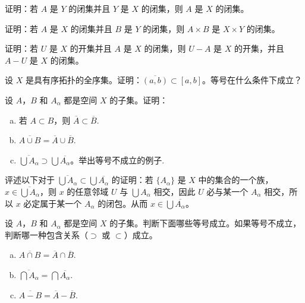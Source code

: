 \documentclass[../../main.tex]{subfiles}
\begin{document}
\begin{exercise}\label{exercise:ch02-闭集与极限点-2}
证明：若 $A$ 是 $Y$ 的闭集并且 $Y$ 是 $X$ 的闭集，则 $A$ 是 $X$ 的闭集。
\end{exercise}

\begin{exercise}\label{exercise:ch02-闭集与极限点-3}
证明：若 $A$ 是 $X$ 的闭集并且 $B$ 是 $Y$ 的闭集，则 $A \times B$ 是 $X \times Y$ 的闭集。
\end{exercise}

\begin{exercise}\label{exercise:ch02-闭集与极限点-4}
证明：若 $U$ 是 $X$ 的开集并且 $A$ 是 $X$ 的闭集，则 $U - A$ 是 $X$ 的开集，并且 $A - U$ 是 $X$ 的闭集。
\end{exercise}

\begin{exercise}\label{exercise:ch02-闭集与极限点-5}
设 $X$ 是具有序拓扑的全序集。证明：$\overline{(a, b)} \subset [a, b]$。等号在什么条件下成立？
\end{exercise}

\begin{exercise}\label{exercise:ch02-闭集与极限点-6}
设 $A$，$B$ 和 $A_{\alpha}$ 都是空间 $X$ 的子集。证明：
\begin{enumerate}[(a)]
\item 若 $A \subset B$，则 $\overline{A} \subset \overline{B}$.
\item $\overline{A \cup B} = \overline{A} \cup \overline{B}$.
\item $\overline{\bigcup A_{\alpha}} \supset \bigcup \overline{A_{\alpha}}$。举出等号不成立的例子.
\end{enumerate}
\end{exercise}

\begin{exercise}\label{exercise:ch02-闭集与极限点-7}
评述以下对于 $\overline{\bigcup A_{\alpha}} \subset \bigcup \overline{A_{\alpha}}$ 的证明：若 $\{A_{\alpha}\}$ 是 $X$ 中的集合的一个族，$x \in \overline{\bigcup A_{\alpha}}$，则 $x$ 的任意邻域 $U$ 与 $\bigcup A_{\alpha}$ 相交，因此 $U$ 必与某一个 $A_{\alpha}$ 相交，所以 $x$ 必定属于某一个 $A_{\alpha}$ 的闭包。从而 $x \in \bigcup \overline{A_{\alpha}}$。
\end{exercise}

\begin{exercise}\label{exercise:ch02-闭集与极限点-8}
设 $A$，$B$ 和 $A_{\alpha}$ 都是空间 $X$ 的子集。判断下面哪些等号成立。如果等号不成立，判断哪一种包含关系（$\supset$ 或 $\subset$）成立。
\begin{enumerate}[(a)]
\item $\overline{A \cap B} = \overline{A} \cap \overline{B}$.
\item $\overline{\bigcap A_{\alpha}} = \bigcap \overline{A_{\alpha}}$.
\item $\overline{A - B} = \overline{A} - \overline{B}$.
\end{enumerate}
\end{exercise}
\end{document}
